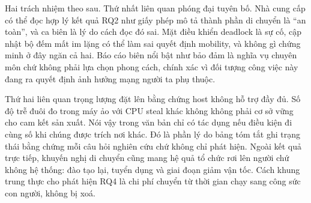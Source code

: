 Hai trách nhiệm theo sau. Thứ nhất liên quan phóng đại tuyên bố. Nhà cung cấp có thể đọc hợp lý
kết quả RQ2 như giấy phép mô tả thành phần di chuyển là ``an toàn'', và ca biên
là lý do cách đọc đó sai. Mặt điều khiển deadlock là sự cố, cập nhật bộ đếm
mất im lặng có thể làm sai quyết định mobility, và không gì chứng minh ở đây
ngăn cả hai. Báo cáo biên nổi bật như bảo đảm là
nghĩa vụ chuyên môn chứ không phải lựa chọn phong cách, chính xác vì đối tượng
công việc này đang ra quyết định ảnh hưởng mạng người ta phụ thuộc.

Thứ hai liên quan trọng lượng
đặt lên bằng chứng host không hỗ trợ đầy đủ. Số độ trễ đuôi đo trong máy ảo
với CPU steal khác không không phải cơ sở vững cho cam kết sản xuất. Nói vậy
trong văn bản chỉ có tác dụng nếu điều kiện đi cùng số khi chúng được trích
nơi khác. Đó là phần
lý do bảng tóm tắt ghi trạng thái bằng chứng mỗi câu hỏi nghiên cứu chứ không chỉ
phát hiện. Ngoài kết quả trực tiếp, khuyến nghị di chuyển cũng mang
hệ quả tổ chức rơi lên người chứ không hệ thống: đào tạo lại, tuyển dụng và
giai đoạn giảm vận tốc. Cách khung trung thực cho phát hiện RQ4 là chi phí
chuyển từ thời gian chạy sang công sức con người, không bị xoá.

